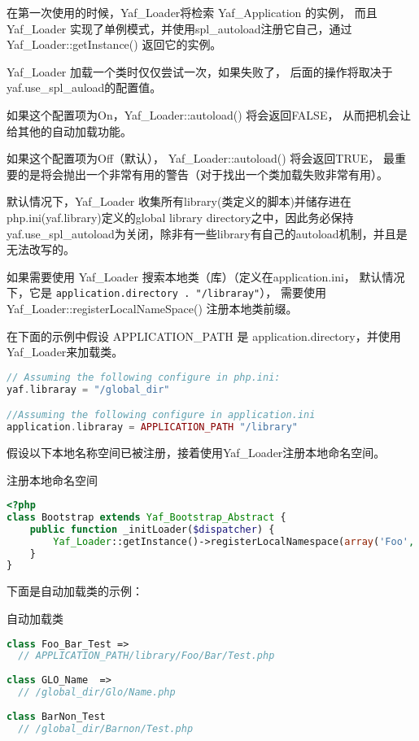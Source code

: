 在第一次使用的时候，Yaf\_Loader将检索 Yaf\_Application 的实例， 而且Yaf\_Loader 实现了单例模式，并使用spl\_autoload注册它自己，通过 Yaf\_Loader::getInstance() 返回它的实例。

Yaf\_Loader 加载一个类时仅仅尝试一次，如果失败了， 后面的操作将取决于yaf.use\_spl\_auload的配置值。

\begin{compactitem}
\item 如果这个配置项为On，Yaf\_Loader::autoload() 将会返回FALSE， 从而把机会让给其他的自动加载功能。
\item 如果这个配置项为Off（默认）， Yaf\_Loader::autoload() 将会返回TRUE， 最重要的是将会抛出一个非常有用的警告（对于找出一个类加载失败非常有用）。
\end{compactitem}

默认情况下，Yaf\_Loader 收集所有library(类定义的脚本)并储存进在 php.ini(yaf.library)定义的global library directory之中，因此务必保持yaf.use\_spl\_autoload为关闭，除非有一些library有自己的autoload机制，并且是无法改写的。

如果需要使用 Yaf\_Loader 搜索本地类（库）（定义在application.ini， 默认情况下，它是 \texttt{application.directory . "/libraray"}）， 需要使用 Yaf\_Loader::registerLocalNameSpace() 注册本地类前缀。

在下面的示例中假设 APPLICATION\_PATH 是 application.directory，并使用Yaf\_Loader来加载类。


\begin{lstlisting}[language=PHP]
// Assuming the following configure in php.ini:
yaf.libraray = "/global_dir"

//Assuming the following configure in application.ini
application.libraray = APPLICATION_PATH "/library"
\end{lstlisting}

假设以下本地名称空间已被注册，接着使用Yaf\_Loader注册本地命名空间。

\begin{example}
注册本地命名空间
\begin{lstlisting}[language=PHP]
<?php
class Bootstrap extends Yaf_Bootstrap_Abstract {
    public function _initLoader($dispatcher) {
        Yaf_Loader::getInstance()->registerLocalNamespace(array('Foo','Bar'));
    }
}
\end{lstlisting}
\end{example}


下面是自动加载类的示例：

\begin{example}
自动加载类
\begin{lstlisting}[language=PHP]
class Foo_Bar_Test =>
  // APPLICATION_PATH/library/Foo/Bar/Test.php
  
class GLO_Name  =>
  // /global_dir/Glo/Name.php
 
class BarNon_Test
  // /global_dir/Barnon/Test.php
\end{lstlisting}
\end{example}

